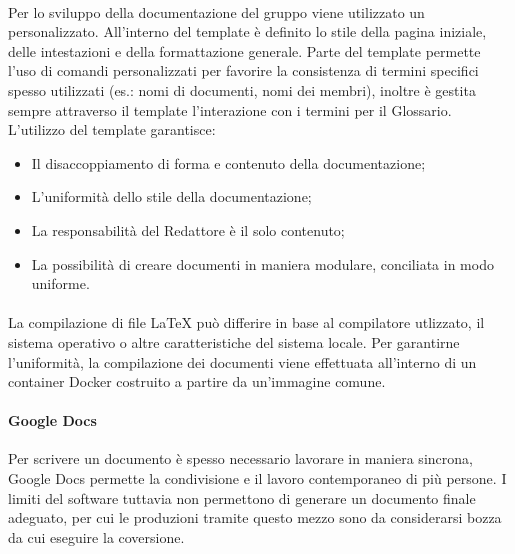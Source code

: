 \paragraph{}
Per lo sviluppo della documentazione del gruppo viene utilizzato un   personalizzato. All'interno del template è definito lo stile della pagina iniziale, delle intestazioni e della formattazione generale.
Parte del template permette l'uso di comandi personalizzati per favorire la consistenza di termini specifici spesso utilizzati (es.: nomi di documenti, nomi dei membri), inoltre è gestita sempre attraverso il template l'interazione con i termini per il Glossario.\\
L'utilizzo del template garantisce:
\begin{itemize}
  \item Il disaccoppiamento di forma e contenuto della documentazione;
  \item L'uniformità dello stile della documentazione;
  \item La responsabilità del Redattore è il solo contenuto;
  \item La possibilità di creare documenti in maniera modulare, conciliata in modo uniforme.
\end{itemize}

\paragraph{}
La compilazione di file LaTeX può differire in base al compilatore utlizzato, il sistema operativo o altre caratteristiche del sistema locale. Per garantirne l'uniformità, la compilazione dei documenti viene effettuata all'interno di un container Docker costruito a partire da un'immagine comune.

\paragraph{Google Docs}
Per scrivere un documento è spesso necessario lavorare in maniera sincrona, Google Docs permette la condivisione e il lavoro contemporaneo di più persone. I limiti del software tuttavia non permettono di generare un documento finale adeguato, per cui le produzioni tramite questo mezzo sono da considerarsi bozza da cui eseguire la coversione.


